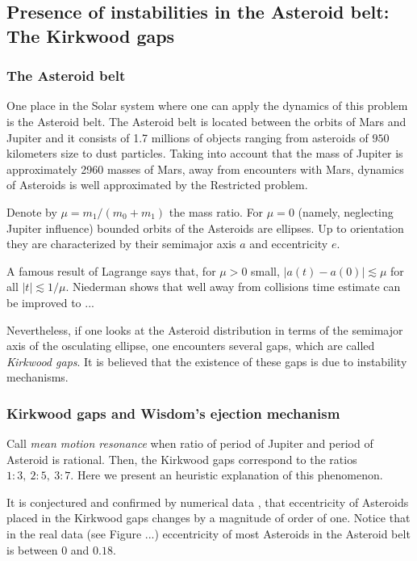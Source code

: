 \subsection{Presence of instabilities in the Asteroid belt: The Kirkwood gaps}


\subsubsection{The Asteroid belt} One place in the Solar system where
one can apply the dynamics of this problem is the Asteroid belt. 
The Asteroid belt is located  between the orbits of Mars and Jupiter and it consists 
of 1.7 millions of objects ranging from  asteroids of $950$ kilometers size to  dust particles.  Taking into account that the mass 
of Jupiter is approximately 2960 masses of Mars, away from encounters with Mars,
dynamics of Asteroids is well approximated by the Restricted problem. 

Denote by $\mu=m_1/(m_0+m_1)$ the mass ratio. For $\mu=0$ (namely, neglecting Jupiter influence) bounded orbits 
of the Asteroids are ellipses. Up to orientation they are characterized by 
their semimajor axis $a$ and eccentricity $e$. 

A famous result of Lagrange \cite{ArnoldKN88} says that, for $\mu>0$ small, $|a(t)-a(0)|\lesssim \mu$ 
for all $|t|\lesssim 1/\mu$. Niederman shows that well away from 
collisions time estimate can be improved to ...

Nevertheless, if one looks at the Asteroid distribution in terms of the semimajor axis of the osculating ellipse, one encounters several gaps, which are called \emph{Kirkwood gaps}. It is believed that the existence of these gaps is due to instability mechanisms.

\subsubsection{Kirkwood gaps and Wisdom's ejection mechanism}

Call {\it mean motion resonance} when ratio of period of Jupiter 
and period of Asteroid is rational. Then, the Kirkwood gaps correspond to  the ratios $1:3,\ 2:5,\ 3:7$. 
Here we present an heuristic explanation of this phenomenon. 


It is conjectured and confirmed by numerical data \cite{Wisdom82},
that eccentricity of Asteroids placed in the Kirkwood gaps changes by a magnitude of order of one.
Notice that in the real data (see Figure ...) eccentricity
of most Asteroids in the Asteroid belt is between $0$ and $0.18$. 


